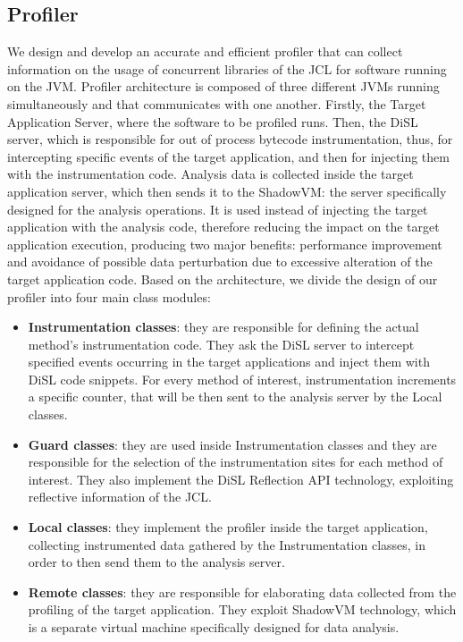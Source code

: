 \documentclass[]{usiinfthesis}
\begin{document}
\subsection{Profiler}
We design and develop an accurate and efficient profiler that can collect information on the usage of concurrent libraries of the JCL for software running on the JVM. Profiler architecture is composed of three different JVMs running simultaneously and that communicates with one another. Firstly, the Target Application Server, where the software to be profiled runs. Then, the DiSL server, which is responsible for out of process bytecode instrumentation, thus, for intercepting specific events of the target application, and then for injecting them with the instrumentation code. Analysis data is collected inside the target application server, which then sends it to the ShadowVM: the server specifically designed for the analysis operations. It is used instead of injecting the target application with the analysis code, therefore reducing the impact on the target application execution, producing two major benefits: performance improvement and avoidance of possible data perturbation due to excessive alteration of the target application code. Based on the architecture, we divide the design of our profiler into four main class modules:
\begin{itemize}
\item \textbf{Instrumentation classes}: they are responsible for defining the actual method's instrumentation code. They ask the DiSL server to intercept specified events occurring in the target applications and inject them with DiSL code snippets. For every method of interest, instrumentation increments a specific counter, that will be then sent to the analysis server by the Local classes.
\item \textbf{Guard classes}: they are used inside Instrumentation classes and they are responsible for the selection of the instrumentation sites for each method of interest. They also implement the DiSL Reflection API technology, exploiting reflective information of the JCL.
\item \textbf{Local classes}: they implement the profiler inside the target application, collecting instrumented data gathered by the Instrumentation classes, in order to then send them to the analysis server.
\item \textbf{Remote classes}: they are responsible for elaborating data collected from the profiling of the target application. They exploit ShadowVM technology, which is a separate virtual machine specifically designed for data analysis.
\end{itemize}
\end{document}
